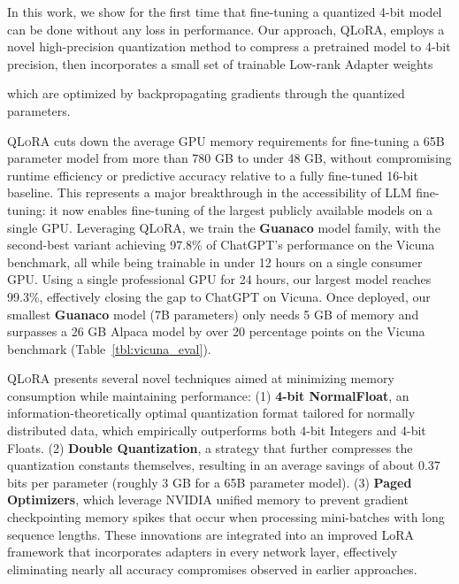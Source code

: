 In this work, we show for the first time that fine-tuning a quantized 4-bit model can be done without any loss in performance. Our approach, \textsc{QLoRA}, employs a novel high-precision quantization method to compress a pretrained model to 4-bit precision, then incorporates a small set of trainable Low-rank Adapter weights \citep{hu2021lora} 

which are optimized by backpropagating gradients through the quantized parameters.

\textsc{QLoRA} cuts down the average GPU memory requirements for fine-tuning a 65B parameter model from more than 780 GB to under 48 GB, without compromising runtime efficiency or predictive accuracy relative to a fully fine-tuned 16-bit baseline. This represents a major breakthrough in the accessibility of LLM fine-tuning: it now enables fine-tuning of the largest publicly available models on a single GPU. Leveraging \textsc{QLoRA}, we train the \textbf{Guanaco} model family, with the second-best variant achieving 97.8\% of ChatGPT’s performance on the Vicuna~\citep{vicuna2023} benchmark, all while being trainable in under 12 hours on a single consumer GPU. Using a single professional GPU for 24 hours, our largest model reaches 99.3\%, effectively closing the gap to ChatGPT on Vicuna. Once deployed, our smallest \textbf{Guanaco} model (7B parameters) only needs 5 GB of memory and surpasses a 26 GB Alpaca model by over 20 percentage points on the Vicuna benchmark (Table~\ref{tbl:vicuna_eval}).

\textsc{QLoRA} presents several novel techniques aimed at minimizing memory consumption while maintaining performance: (1) \textbf{4-bit NormalFloat}, an information-theoretically optimal quantization format tailored for normally distributed data, which empirically outperforms both 4-bit Integers and 4-bit Floats. (2) \textbf{Double Quantization}, a strategy that further compresses the quantization constants themselves, resulting in an average savings of about 0.37 bits per parameter (roughly 3 GB for a 65B parameter model). (3) \textbf{Paged Optimizers}, which leverage NVIDIA unified memory to prevent gradient checkpointing memory spikes that occur when processing mini-batches with long sequence lengths. These innovations are integrated into an improved LoRA framework that incorporates adapters in every network layer, effectively eliminating nearly all accuracy compromises observed in earlier approaches.

